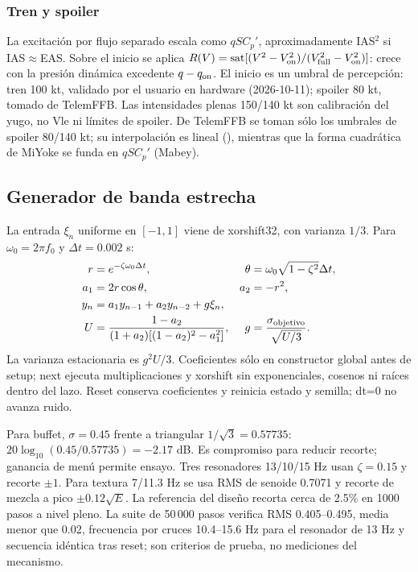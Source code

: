 \documentclass[11pt,a4paper]{article}
\newcommand{\code}[1]{\texttt{\detokenize{#1}}}
\newcommand{\sat}{\operatorname{sat}}
\begin{document}
\subsubsection{Tren y spoiler}
La excitación por flujo separado escala como $qSC_p'$, aproximadamente IAS$^2$ si IAS$\approx$EAS. Sobre el inicio se aplica $R(V)=\sat[(V^2-V_{\rm on}^2)/(V_{\rm full}^2-V_{\rm on}^2)]$: crece con la presión dinámica excedente $q-q_{\rm on}$. El inicio es un umbral de percepción: tren 100 kt, validado por el usuario en hardware (2026-10-11); spoiler 80 kt, tomado de TelemFFB. Las intensidades plenas 150/140 kt son calibración del yugo, no Vle ni límites de spoiler. De TelemFFB se toman sólo los umbrales de spoiler 80/140 kt; su interpolación es lineal (\code{utils.scale}), mientras que la forma cuadrática de MiYoke se funda en $qSC_p'$ (Mabey).



\subsection{Generador de banda estrecha}
La entrada $\xi_n$ uniforme en $[-1,1]$ viene de xorshift32, con varianza $1/3$. Para $\omega_0=2\pi f_0$ y $\Delta t=0.002$ s:
\begin{align}
r&=e^{-\zeta\omega_0\Delta t},&\theta&=\omega_0\sqrt{1-\zeta^2}\Delta t,\\
a_1&=2r\cos\theta,&a_2&=-r^2,\\
y_n&=a_1y_{n-1}+a_2y_{n-2}+g\xi_n,\\
U&=\frac{1-a_2}{(1+a_2)[(1-a_2)^2-a_1^2]},&g&=\frac{\sigma_{\rm objetivo}}{\sqrt{U/3}}.
\end{align}
La varianza estacionaria es $g^2U/3$. Coeficientes sólo en constructor global antes de setup; next ejecuta multiplicaciones y xorshift sin exponenciales, cosenos ni raíces dentro del lazo. Reset conserva coeficientes y reinicia estado y semilla; dt=0 no avanza ruido.

Para buffet, $\sigma=0.45$ frente a triangular $1/\sqrt3=0.57735$: $20\log_{10}(0.45/0.57735)=-2.17$ dB. Es compromiso para reducir recorte; ganancia de menú permite ensayo. Tres resonadores 13/10/15 Hz usan $\zeta=0.15$ y recorte $\pm1$. Para textura 7/11.3 Hz se usa RMS de senoide 0.7071 y recorte de mezcla a pico $\pm0.12\sqrt E$. La referencia del diseño recorta cerca de 2.5\% en 1000 pasos a nivel pleno. La suite de 50\,000 pasos verifica RMS 0.405--0.495, media menor que 0.02, frecuencia por cruces 10.4--15.6 Hz para el resonador de 13 Hz y secuencia idéntica tras reset; son criterios de prueba, no mediciones del mecanismo.
\end{document}
